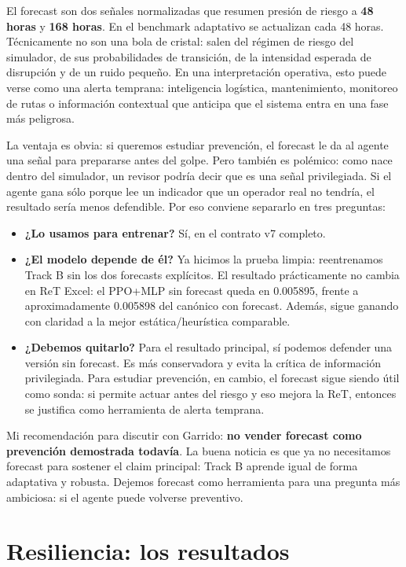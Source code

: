 \documentclass[11pt]{article}
\begin{document}
El forecast son dos señales normalizadas que resumen presión de riesgo a \textbf{48 horas} y
\textbf{168 horas}. En el benchmark adaptativo se actualizan cada 48 horas. Técnicamente no son una
bola de cristal: salen del régimen de riesgo del simulador, de sus probabilidades de transición, de
la intensidad esperada de disrupción y de un ruido pequeño. En una interpretación operativa, esto
puede verse como una alerta temprana: inteligencia logística, mantenimiento, monitoreo de rutas o
información contextual que anticipa que el sistema entra en una fase más peligrosa.

La ventaja es obvia: si queremos estudiar prevención, el forecast le da al agente una señal para
prepararse antes del golpe. Pero también es polémico: como nace dentro del simulador, un revisor
podría decir que es una señal privilegiada. Si el agente gana sólo porque lee un indicador que un
operador real no tendría, el resultado sería menos defendible. Por eso conviene separarlo en tres
preguntas:

\begin{itemize}
  \item \textbf{¿Lo usamos para entrenar?} Sí, en el contrato v7 completo.
  \item \textbf{¿El modelo depende de él?} Ya hicimos la prueba limpia: reentrenamos Track B sin los
        dos forecasts explícitos. El resultado prácticamente no cambia en ReT Excel: el PPO+MLP
        sin forecast queda en 0.005895, frente a aproximadamente 0.005898 del canónico con forecast.
        Además, sigue ganando con claridad a la mejor estática/heurística comparable.
  \item \textbf{¿Debemos quitarlo?} Para el resultado principal, sí podemos defender una versión sin
        forecast. Es más conservadora y evita la crítica de información privilegiada. Para estudiar
        prevención, en cambio, el forecast sigue siendo útil como sonda: si permite actuar antes del
        riesgo y eso mejora la ReT, entonces se justifica como herramienta de alerta temprana.
\end{itemize}

Mi recomendación para discutir con Garrido: \textbf{no vender forecast como prevención demostrada
todavía}. La buena noticia es que ya no necesitamos forecast para sostener el claim principal:
Track B aprende igual de forma adaptativa y robusta. Dejemos forecast como herramienta para una
pregunta más ambiciosa: si el agente puede volverse preventivo.

\section*{Resiliencia: los resultados}
\end{document}
